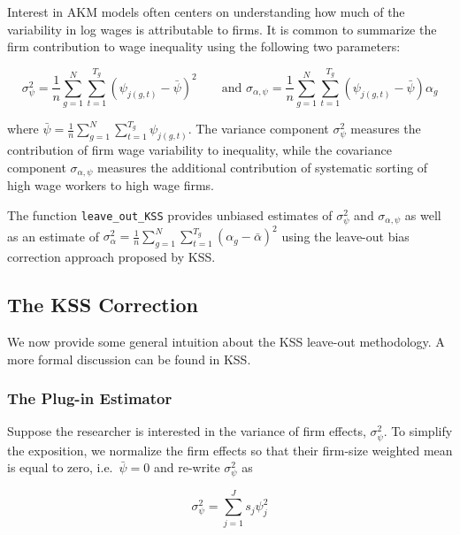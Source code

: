 \documentclass[11pt]{article}
\begin{document}
Interest in AKM models often centers on understanding how much of the
variability in log wages is attributable to firms. It is common to
summarize the firm contribution to wage inequality using the following
two parameters:

\begin{equation}
\sigma_{\psi }^2 =\frac{1}{n}\sum_{g=1}^N \sum_{t=1}^{T_g } {\left(\psi_{j\left(g,t\right)} -\bar{\psi} \right)}^2 \qquad \text{and }\sigma_{\alpha ,\psi } =\frac{1}{n}\sum_{g=1}^N \sum_{t=1}^{T_g } \left(\psi_{j\left(g,t\right)} -\bar{\psi} \right)\alpha_g           
\end{equation}

where
\(\bar{\psi} =\frac{1}{n}\sum_{g=1}^N \sum_{t=1}^{T_g } \psi_{j(g,t)}\).
The variance component \(\sigma_{\psi }^2\) measures the contribution of
firm wage variability to inequality, while the covariance component
\(\sigma_{\alpha ,\psi }\) measures the additional contribution of
systematic sorting of high wage workers to high wage firms.

The function \texttt{leave\_out\_KSS} provides unbiased estimates of
\(\sigma_{\psi }^2\) and \(\sigma_{\alpha ,\psi }\) as well as an
estimate of
\(\sigma_{\alpha }^2 =\frac{1}{n}\sum_{g=1}^N \sum_{t=1}^{T_g } {\left(\alpha_g -\bar{\alpha} \right)}^2\)
using the leave-out bias correction approach proposed by KSS.

\hypertarget{the-kss-correction}{%
\subsection{The KSS Correction}\label{the-kss-correction}}

We now provide some general intuition about the KSS leave-out
methodology. A more formal discussion can be found in KSS.
\hypertarget{the-plug-in-estimator}{%
\subsubsection{The Plug-in Estimator}\label{the-plug-in-estimator}}

Suppose the researcher is interested in the variance of firm effects,
\(\sigma_{\psi }^2\). To simplify the exposition, we normalize the firm
effects so that their firm-size weighted mean is equal to zero,
i.e.~\(\bar{\psi}=0\) and re-write \(\sigma_{\psi }^2\) as

\begin{equation}
\sigma_{\psi }^2 =\sum_{j=1}^J s_{j}\psi^{2}_{j}
\end{equation}
\end{document}
